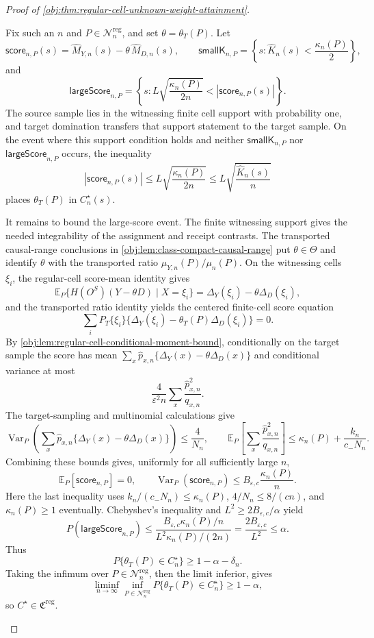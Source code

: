 \documentclass[11pt]{article}
\begin{document}
\begin{proof}[Proof of \cref{obj:thm:regular-cell-unknown-weight-attainment}]
\begin{enumerate}
Fix such an \(n\) and \(P\in\mathcal N_n^{\mathrm{reg}}\), and set \(\theta=\theta_T(P)\). Let
\[
\mathsf{score}_{n,P}(s)
=
\widehat M_{Y,n}(s)-\theta\,\widehat M_{D,n}(s),
\qquad
\mathsf{smallK}_{n,P}
=
\left\{s:\widehat K_n(s)<\frac{\kappa_n(P)}2\right\},
\]
and
\[
\mathsf{largeScore}_{n,P}
=
\left\{s:
L\sqrt{\frac{\kappa_n(P)}{2n}}
<
|\mathsf{score}_{n,P}(s)|
\right\}.
\]
The source sample lies in the witnessing finite cell support with probability one, and target domination transfers that support statement to the target sample. On the event where this support condition holds and neither \(\mathsf{smallK}_{n,P}\) nor \(\mathsf{largeScore}_{n,P}\) occurs, the inequality
\[
|\mathsf{score}_{n,P}(s)|
\le L\sqrt{\frac{\kappa_n(P)}{2n}}
\le L\sqrt{\frac{\widehat K_n(s)}{n}}
\]
places \(\theta_T(P)\) in \(C^\star_n(s)\).

It remains to bound the large-score event. The finite witnessing support gives the needed integrability of the assignment and receipt contrasts. The transported causal-range conclusions in \cref{obj:lem:class-compact-causal-range} put \(\theta\in\Theta\) and identify \(\theta\) with the transported ratio \(\mu_{Y,n}(P)/\mu_n(P)\). On the witnessing cells \(\xi_i\), the regular-cell score-mean identity gives
\[
\mathbb E_P\{H(O^S)(Y-\theta D)\mid X=\xi_i\}
=
\Delta_Y(\xi_i)-\theta\Delta_D(\xi_i),
\]
and the transported ratio identity yields the centered finite-cell score equation
\[
\sum_i P_T\{\xi_i\}
\{\Delta_Y(\xi_i)-\theta_T(P)\Delta_D(\xi_i)\}=0.
\]
By \cref{obj:lem:regular-cell-conditional-moment-bound}, conditionally on the target sample the score has mean
\(\sum_x\widehat p_{x,n}\{\Delta_Y(x)-\theta\Delta_D(x)\}\) and conditional variance at most
\[
\frac{4}{\varepsilon^2n}\sum_x\frac{\widehat p_{x,n}^2}{q_{x,n}}.
\]
The target-sampling and multinomial calculations give
\[
\operatorname{Var}_P\!\left(
\sum_x\widehat p_{x,n}\{\Delta_Y(x)-\theta\Delta_D(x)\}
\right)
\le \frac4{N_n},
\qquad
\mathbb E_P\!\left[\sum_x\frac{\widehat p_{x,n}^2}{q_{x,n}}\right]
\le \kappa_n(P)+\frac{k_n}{c_-N_n}.
\]
Combining these bounds gives, uniformly for all sufficiently large \(n\),
\[
\mathbb E_P[\mathsf{score}_{n,P}]=0,
\qquad
\operatorname{Var}_P(\mathsf{score}_{n,P})
\le
B_{\varepsilon,c}\frac{\kappa_n(P)}{n}.
\]
Here the last inequality uses \(k_n/(c_-N_n)\le\kappa_n(P)\), \(4/N_n\le8/(cn)\), and \(\kappa_n(P)\ge1\) eventually. Chebyshev's inequality and \(L^2\ge 2B_{\varepsilon,c}/\alpha\) yield
\[
P(\mathsf{largeScore}_{n,P})
\le
\frac{B_{\varepsilon,c}\kappa_n(P)/n}
{L^2\kappa_n(P)/(2n)}
=
\frac{2B_{\varepsilon,c}}{L^2}
\le\alpha .
\]
Thus
\[
P\{\theta_T(P)\in C^\star_n\}
\ge 1-\alpha-\delta_n .
\]
Taking the infimum over \(P\in\mathcal N_n^{\mathrm{reg}}\), then the limit inferior, gives
\[
\liminf_{n\to\infty}\inf_{P\in\mathcal N_n^{\mathrm{reg}}}
P\{\theta_T(P)\in C^\star_n\}\ge1-\alpha,
\]
so \(C^\star\in\mathfrak C^{\mathrm{reg}}\). %


\end{enumerate}
\end{proof}
\end{document}
